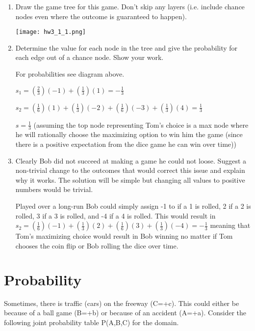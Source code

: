 \documentclass[12pt]{article}
\begin{document}
\begin{enumerate}
\item Draw the game tree for this game. Don't skip any layers
  (i.e. include chance nodes even where the outcome is guaranteed to
  happen).

  \begin{center}
    \texttt{[image: hw3\_1\_1.png]}
  \end{center}

\item Determine the value for each node in the tree and give the
    probability for each edge out of a chance node. Show your work.

    For probabilities see diagram above.

    $s_1 = (\frac{2}{3}) (-1) + (\frac{1}{3}) (1) = -\frac{1}{3}$ 

    $s_2 = (\frac{1}{6}) (1) + (\frac{1}{3}) (-2) + (\frac{1}{6}) (-3) + (\frac{1}{3}) (4)= \frac{1}{3}$ 

    $s = \frac{1}{3}$  (assuming the top node representing Tom's choice is a max node where he will rationally choose the maximizing option to win him the game (since there is a positive expectation from the dice game he can win over time))

\item Clearly Bob did not succeed at making a game he could not
    loose. Suggest a non-trivial change to the outcomes that would
    correct this issue and explain why it works. The solution will be
    simple but changing all values to positive numbers would be
    trivial.

    Played over a long-run Bob could simply assign -1 to if a 1 is rolled, 2 if a 2 is rolled, 3 if a 3 is rolled, and -4 if a 4 is rolled.
    This would result in $s_2 = (\frac{1}{6}) (-1) + (\frac{1}{3}) (2) + (\frac{1}{6}) (3) + (\frac{1}{3}) (-4)= -\frac{1}{3}$ meaning that Tom's maximizing choice would result in Bob winning no matter if Tom chooses the coin flip or Bob rolling the dice over time.

\end{enumerate}

\clearpage

\section{Probability}

Sometimes, there is traffic (cars) on the freeway (C=+c).  This could
either be because of a ball game (B=+b) or because of an accident
(A=+a).  Consider the following joint probability table P(A,B,C) for
the domain.
\end{document}
